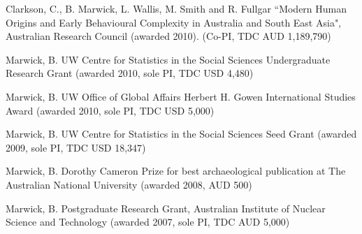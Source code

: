 \ind Clarkson, C., B. Marwick, L. Wallis, M. Smith and R. Fullgar  ``Modern Human Origins and Early Behavioural Complexity in Australia and South East Asia", Australian Research Council (awarded 2010). (Co-PI, TDC AUD 1,189,790)

\ind Marwick, B. UW Centre for Statistics in the Social Sciences Undergraduate Research Grant (awarded 2010, sole PI, TDC USD 4,480)

\ind Marwick, B. UW Office of Global Affairs Herbert H. Gowen International Studies Award (awarded 2010, sole  PI, TDC USD 5,000)

\ind Marwick, B. UW Centre for Statistics in the Social Sciences Seed Grant (awarded 2009, sole PI, TDC USD 18,347)

\ind Marwick, B. Dorothy Cameron Prize for best archaeological publication at The Australian National University (awarded 2008, AUD 500)

\ind Marwick, B. Postgraduate Research Grant, Australian Institute of Nuclear Science and Technology (awarded 2007, sole PI, TDC AUD 5,000)